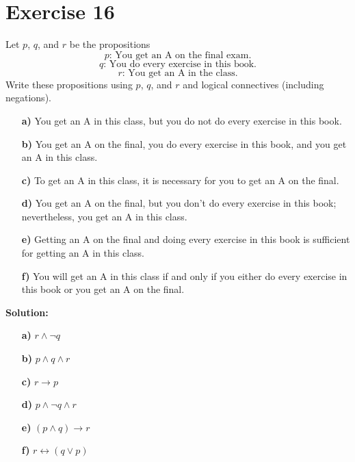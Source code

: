 \documentclass{Axon}
\begin{document}
\section*{Exercise 16}
Let \(p\), \(q\), and \(r\) be the propositions
\begin{equation}
    p\text{: You get an A on the final exam.}
\end{equation}
\begin{equation}
    q\text{: You do every exercise in this book.}
\end{equation}
\begin{equation}
    r\text{: You get an A in the class.}
\end{equation}
Write these propositions using \(p\), \(q\), and \(r\) and logical connectives (including negations).
\begin{enumerate}
    \item[\textbf{a)}] You get an A in this class, but you do not do every exercise in this book.
    \item[\textbf{b)}] You get an A on the final, you do every exercise in this book, and you get an A in this class.
    \item[\textbf{c)}] To get an A in this class, it is necessary for you to get an A on the final.
    \item[\textbf{d)}] You get an A on the final, but you don't do every exercise in this book; nevertheless, you get an A in this class.
    \item[\textbf{e)}] Getting an A on the final and doing every exercise in this book is sufficient for getting an A in this class.
    \item[\textbf{f)}] You will get an A in this class if and only if you either do every exercise in this book or you get an A on the final.
\end{enumerate}

\noindent
\textbf{Solution:}
\begin{enumerate}
    \item[\textbf{a)}] \(r \land \lnot q\)
    \item[\textbf{b)}] \(p \land q \land r\)
    \item[\textbf{c)}] \(r \to p\)
    \item[\textbf{d)}] \(p \land \lnot q \land r\)
    \item[\textbf{e)}] \((p \land q) \to r\)
    \item[\textbf{f)}] \(r \leftrightarrow (q \lor p)\)
\end{enumerate}
\end{document}
